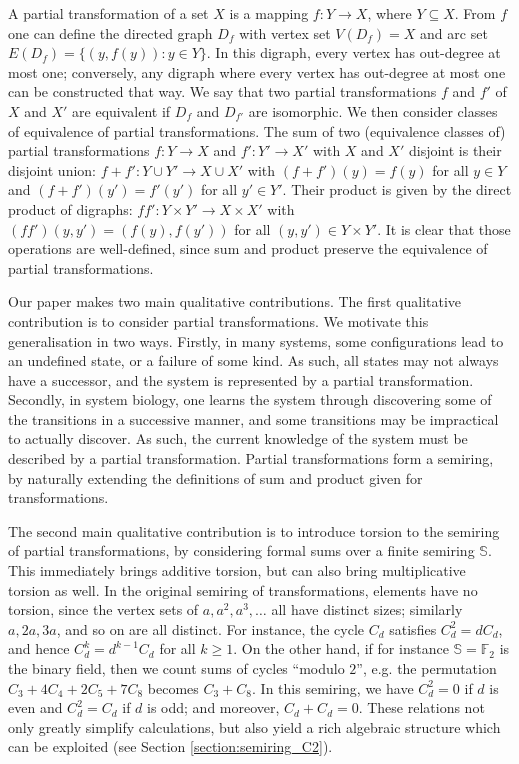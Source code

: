 \documentclass[a4paper, 11pt]{article}
\theoremstyle{plain}
\theoremstyle{definition}
\newcommand{\F} {\mathbb{F}}
\begin{document}
A partial transformation of a set $X$ is a mapping $f : Y \to X$, where $Y \subseteq X$. From $f$ one can define the directed graph $D_f$ with vertex set $V(D_f) = X$ and arc set $E(D_f) = \{ (y, f(y)) : y \in Y \}$. In this digraph, every vertex has out-degree at most one; conversely, any digraph where every vertex has out-degree at most one can be constructed that way. We say that two partial transformations $f$ and $f'$ of $X$ and $X'$ are equivalent if $D_f$ and $D_{f'}$ are isomorphic. We then consider classes of equivalence of partial transformations. The sum of two (equivalence classes of) partial transformations $f : Y \to X$ and $f' : Y' \to X'$ with $X$ and $X'$ disjoint is their disjoint union: $f+f' : Y \cup Y' \to X \cup X'$ with $(f + f')(y) = f(y)$ for all $y \in Y$ and $(f + f')( y' ) = f'( y' )$ for all $y' \in Y'$. Their product is given by the direct product of digraphs: $f f' : Y \times Y' \to X \times X'$ with $(ff')( y, y' ) = (f(y), f(y'))$ for all $(y, y') \in Y \times Y'$. It is clear that those operations are well-defined, since sum and product preserve the equivalence of partial transformations.

Our paper makes two main qualitative contributions. The first qualitative contribution is to consider partial transformations. We motivate this generalisation in two ways. Firstly, in many systems, some configurations lead to an undefined state, or a failure of some kind. As such, all states may not always have a successor, and the system is represented by a partial transformation. Secondly, in system biology, one learns the system through discovering some of the transitions in a successive manner, and some transitions may be impractical to actually discover. As such, the current knowledge of the system must be described by a partial transformation. Partial transformations form a semiring, by naturally extending the definitions of sum and product given for transformations.

The second main qualitative contribution is to introduce torsion to the semiring of partial transformations, by considering formal sums over a finite semiring $\mathbb{S}$. This immediately brings additive torsion, but can also bring multiplicative torsion as well. In the original semiring of transformations, elements have no torsion, since the vertex sets of $a, a^2, a^3, \dots$ all have distinct sizes; similarly $a, 2a, 3a$, and so on are all distinct. For instance, the cycle $C_d$ satisfies $C_d^2 = d C_d$, and hence $C_d^k = d^{k-1} C_d$ for all $k \ge 1$. On the other hand, if for instance $\mathbb{S} = \F_2$ is the binary field, then we count sums of cycles ``modulo $2$'', e.g. the permutation $C_3 + 4C_4 + 2C_5 + 7C_8$ becomes $C_3 + C_8$. In this semiring, we have $C_d^2 = 0$ if $d$ is even and $C_d^2 = C_d$ if $d$ is odd; and moreover, $C_d + C_d = 0$. These relations not only greatly simplify calculations, but also yield a rich algebraic structure which can be exploited (see Section \ref{section:semiring_C2}). 
\end{document}
